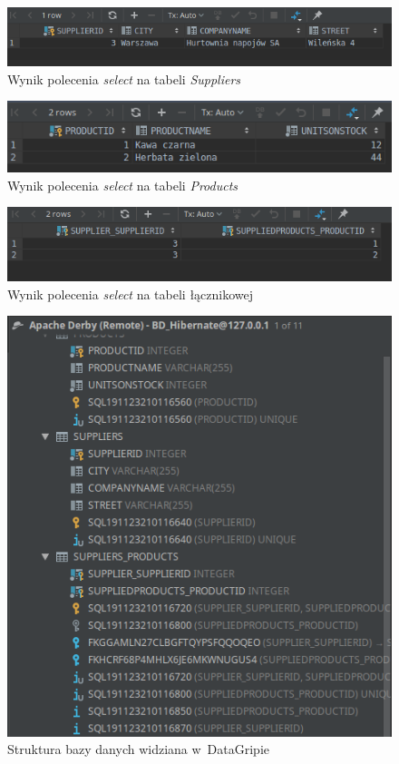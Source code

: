 \documentclass[12pt, a4paper]{mwart}
\begin{document}
\begin{figure}[ht]
  \centering
  \includegraphics[scale=0.5]{IV/4-3.png}
  \caption{Wynik polecenia \textit{select} na tabeli \textit{Suppliers}}
  \label{rys:4.3}
\end{figure}

\begin{figure}[ht]
  \centering
  \includegraphics[scale=0.5]{IV/4-4.png}
  \caption{Wynik polecenia \textit{select} na tabeli \textit{Products}}
  \label{rys:4.4}
\end{figure}

\begin{figure}[ht]
  \centering
  \includegraphics[scale=0.5]{IV/4-5.png}
  \caption{Wynik polecenia \textit{select} na tabeli łącznikowej}
  \label{rys:4.5}
\end{figure}

\begin{figure}[ht]
  \centering
  \includegraphics[scale=0.5]{IV/4-6.png}
  \caption{Struktura bazy danych widziana w~DataGripie}
  \label{rys:4.6}
\end{figure}
\end{document}
